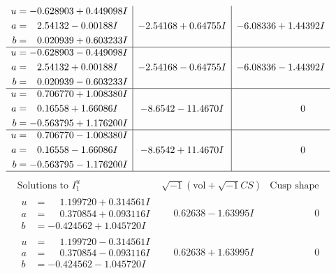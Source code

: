 \documentclass[1p]{elsarticle_modified}
\theoremstyle{definition}
\newcommand{\I}{\sqrt{-1}}
\begin{document}
$$\begin{array}{c|c|c}
\begin{aligned}
u &= -0.628903 + 0.449098 I \\
a &= \phantom{-}2.54132 - 0.00188 I \\
b &= \phantom{-}0.020939 + 0.603233 I\end{aligned}
 & -2.54168 + 0.64755 I & -6.08336 + 1.44392 I \\ \hline\begin{aligned}
u &= -0.628903 - 0.449098 I \\
a &= \phantom{-}2.54132 + 0.00188 I \\
b &= \phantom{-}0.020939 - 0.603233 I\end{aligned}
 & -2.54168 - 0.64755 I & -6.08336 - 1.44392 I \\ \hline\begin{aligned}
u &= \phantom{-}0.706770 + 1.008380 I \\
a &= \phantom{-}0.16558 + 1.66086 I \\
b &= -0.563795 + 1.176200 I\end{aligned}
 & -8.6542 - 11.4670 I & \phantom{-0.000000 } 0 \\ \hline\begin{aligned}
u &= \phantom{-}0.706770 - 1.008380 I \\
a &= \phantom{-}0.16558 - 1.66086 I \\
b &= -0.563795 - 1.176200 I\end{aligned}
 & -8.6542 + 11.4670 I & \phantom{-0.000000 } 0\\
 \hline 
 \end{array}$$\newpage$$\begin{array}{c|c|c}  
\text{Solutions to }I^u_{1}& \I (\text{vol} + \sqrt{-1}CS) & \text{Cusp shape}\\
 \hline 
\begin{aligned}
u &= \phantom{-}1.199720 + 0.314561 I \\
a &= \phantom{-}0.370854 + 0.093116 I \\
b &= -0.424562 + 1.045720 I\end{aligned}
 & \phantom{-}0.62638 - 1.63995 I & \phantom{-0.000000 } 0 \\ \hline\begin{aligned}
u &= \phantom{-}1.199720 - 0.314561 I \\
a &= \phantom{-}0.370854 - 0.093116 I \\
b &= -0.424562 - 1.045720 I\end{aligned}
 & \phantom{-}0.62638 + 1.63995 I & \phantom{-0.000000 } 0 \\ \hline\begin{aligned}

\end{aligned}
\end{array}$$
\end{document}

